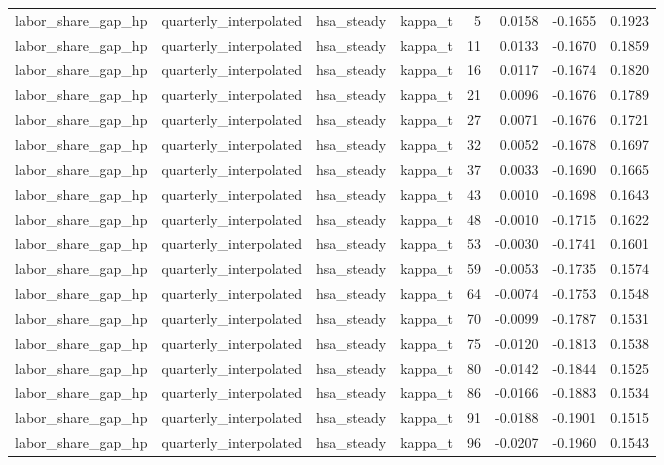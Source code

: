 \begin{tabular}{llllrrrr}
labor\_share\_gap\_hp & quarterly\_interpolated & hsa\_steady & kappa\_t & 5 & 0.0158 & -0.1655 & 0.1923 \\
labor\_share\_gap\_hp & quarterly\_interpolated & hsa\_steady & kappa\_t & 11 & 0.0133 & -0.1670 & 0.1859 \\
labor\_share\_gap\_hp & quarterly\_interpolated & hsa\_steady & kappa\_t & 16 & 0.0117 & -0.1674 & 0.1820 \\
labor\_share\_gap\_hp & quarterly\_interpolated & hsa\_steady & kappa\_t & 21 & 0.0096 & -0.1676 & 0.1789 \\
labor\_share\_gap\_hp & quarterly\_interpolated & hsa\_steady & kappa\_t & 27 & 0.0071 & -0.1676 & 0.1721 \\
labor\_share\_gap\_hp & quarterly\_interpolated & hsa\_steady & kappa\_t & 32 & 0.0052 & -0.1678 & 0.1697 \\
labor\_share\_gap\_hp & quarterly\_interpolated & hsa\_steady & kappa\_t & 37 & 0.0033 & -0.1690 & 0.1665 \\
labor\_share\_gap\_hp & quarterly\_interpolated & hsa\_steady & kappa\_t & 43 & 0.0010 & -0.1698 & 0.1643 \\
labor\_share\_gap\_hp & quarterly\_interpolated & hsa\_steady & kappa\_t & 48 & -0.0010 & -0.1715 & 0.1622 \\
labor\_share\_gap\_hp & quarterly\_interpolated & hsa\_steady & kappa\_t & 53 & -0.0030 & -0.1741 & 0.1601 \\
labor\_share\_gap\_hp & quarterly\_interpolated & hsa\_steady & kappa\_t & 59 & -0.0053 & -0.1735 & 0.1574 \\
labor\_share\_gap\_hp & quarterly\_interpolated & hsa\_steady & kappa\_t & 64 & -0.0074 & -0.1753 & 0.1548 \\
labor\_share\_gap\_hp & quarterly\_interpolated & hsa\_steady & kappa\_t & 70 & -0.0099 & -0.1787 & 0.1531 \\
labor\_share\_gap\_hp & quarterly\_interpolated & hsa\_steady & kappa\_t & 75 & -0.0120 & -0.1813 & 0.1538 \\
labor\_share\_gap\_hp & quarterly\_interpolated & hsa\_steady & kappa\_t & 80 & -0.0142 & -0.1844 & 0.1525 \\
labor\_share\_gap\_hp & quarterly\_interpolated & hsa\_steady & kappa\_t & 86 & -0.0166 & -0.1883 & 0.1534 \\
labor\_share\_gap\_hp & quarterly\_interpolated & hsa\_steady & kappa\_t & 91 & -0.0188 & -0.1901 & 0.1515 \\
labor\_share\_gap\_hp & quarterly\_interpolated & hsa\_steady & kappa\_t & 96 & -0.0207 & -0.1960 & 0.1543 \\

\end{tabular}

